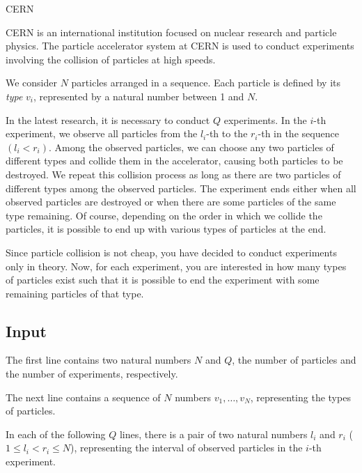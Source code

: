 \begin{statement}[
  problempoints=100,
  timelimit=4 seconds,
  memorylimit=512 MiB,
]{CERN}

CERN is an international institution focused on nuclear research and particle physics.
The particle accelerator system at CERN is used to conduct experiments involving the collision of particles at high speeds.

We consider $N$ particles arranged in a sequence. Each particle is defined by its \textit{type} $v_i$, represented by a natural number between 1 and $N$.

In the latest research, it is necessary to conduct $Q$ experiments. In the $i$-th experiment, we observe all particles from the $l_i$-th to the $r_i$-th in the sequence $(l_i < r_i)$. Among the observed particles, we can choose any two particles of different types and collide them in the accelerator, causing both particles to be destroyed. We repeat this collision process as long as there are two particles of different types among the observed particles. The experiment ends either when all observed particles are destroyed or when there are some particles of the same type remaining. Of course, depending on the order in which we collide the particles, it is possible to end up with various types of particles at the end.

Since particle collision is not cheap, you have decided to conduct experiments only in theory. Now, for each experiment, you are interested in how many types of particles exist such that it is possible to end the experiment with some remaining particles of that type.

\subsection*{Input}

The first line contains two natural numbers $N$ and $Q$, the number of particles and the number of experiments, respectively.

The next line contains a sequence of $N$ numbers $v_1, \dots, v_N$, representing the types of particles.

In each of the following $Q$ lines, there is a pair of two natural numbers $l_i$ and $r_i$ ($1 \leq l_i < r_i \leq N$), representing the interval of observed particles in the $i$-th experiment.


\end{statement}
